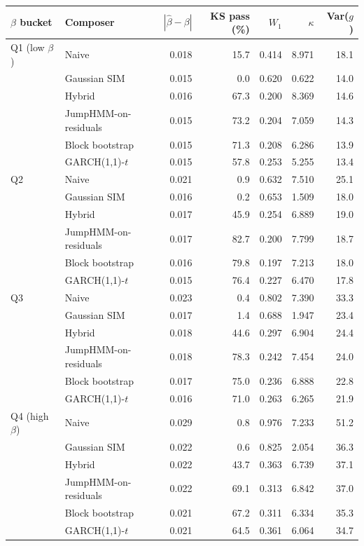 \begin{tabular}{llrrrrr}
\toprule
$\beta$ bucket & Composer & $|\hat\beta-\beta|$ & KS pass (\%) & $W_1$ & $\kappa$ & Var($g$) \\
\midrule
Q1 (low $\beta$) & Naive & 0.018 & 15.7 & 0.414 & 8.971 & 18.1 \\
 & Gaussian SIM & 0.015 & 0.0 & 0.620 & 0.622 & 14.0 \\
 & Hybrid & 0.016 & 67.3 & 0.200 & 8.369 & 14.6 \\
 & JumpHMM-on-residuals & 0.015 & 73.2 & 0.204 & 7.059 & 14.3 \\
 & Block bootstrap & 0.015 & 71.3 & 0.208 & 6.286 & 13.9 \\
 & GARCH(1,1)-$t$ & 0.015 & 57.8 & 0.253 & 5.255 & 13.4 \\
Q2 & Naive & 0.021 & 0.9 & 0.632 & 7.510 & 25.1 \\
 & Gaussian SIM & 0.016 & 0.2 & 0.653 & 1.509 & 18.0 \\
 & Hybrid & 0.017 & 45.9 & 0.254 & 6.889 & 19.0 \\
 & JumpHMM-on-residuals & 0.017 & 82.7 & 0.200 & 7.799 & 18.7 \\
 & Block bootstrap & 0.016 & 79.8 & 0.197 & 7.213 & 18.0 \\
 & GARCH(1,1)-$t$ & 0.015 & 76.4 & 0.227 & 6.470 & 17.8 \\
Q3 & Naive & 0.023 & 0.4 & 0.802 & 7.390 & 33.3 \\
 & Gaussian SIM & 0.017 & 1.4 & 0.688 & 1.947 & 23.4 \\
 & Hybrid & 0.018 & 44.6 & 0.297 & 6.904 & 24.4 \\
 & JumpHMM-on-residuals & 0.018 & 78.3 & 0.242 & 7.454 & 24.0 \\
 & Block bootstrap & 0.017 & 75.0 & 0.236 & 6.888 & 22.8 \\
 & GARCH(1,1)-$t$ & 0.016 & 71.0 & 0.263 & 6.265 & 21.9 \\
Q4 (high $\beta$) & Naive & 0.029 & 0.8 & 0.976 & 7.233 & 51.2 \\
 & Gaussian SIM & 0.022 & 0.6 & 0.825 & 2.054 & 36.3 \\
 & Hybrid & 0.022 & 43.7 & 0.363 & 6.739 & 37.1 \\
 & JumpHMM-on-residuals & 0.022 & 69.1 & 0.313 & 6.842 & 37.0 \\
 & Block bootstrap & 0.021 & 67.2 & 0.311 & 6.334 & 35.3 \\
 & GARCH(1,1)-$t$ & 0.021 & 64.5 & 0.361 & 6.064 & 34.7 \\
\bottomrule
\end{tabular}
